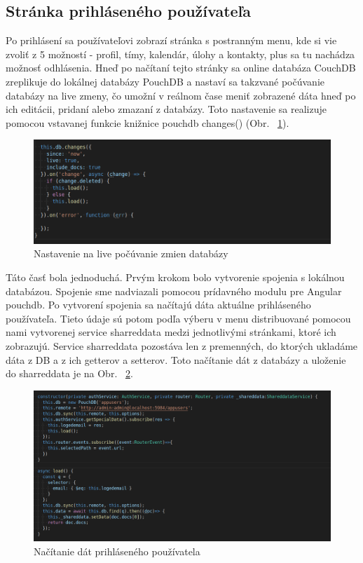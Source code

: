 \subsection{Stránka prihláseného používateľa}
\indent Po prihlásení sa používateľovi zobrazí stránka s postranným menu, kde si vie zvoliť z 5 možností - profil, tímy, kalendár, úlohy a kontakty, plus sa tu nachádza možnosť odhlásenia. Hneď po načítaní tejto stránky sa online databáza CouchDB zreplikuje do lokálnej databázy PouchDB a nastaví sa takzvané počúvanie databázy na live zmeny, čo umožní v reálnom čase meniť zobrazené dáta hneď po ich editácii, pridaní alebo zmazaní z databázy. Toto nastavenie sa realizuje pomocou vstavanej funkcie knižnice pouchdb changes() (Obr. ~\ref{fig:db_change}). 

\begin{figure}[H]
    \centering
    \includegraphics[scale=0.45]{img/imp/db_change.png}
    \caption{Nastavenie na live počúvanie zmien databázy}
    \label{fig:db_change}
\end{figure}

\indent Táto časť bola jednoduchá. Prvým krokom bolo vytvorenie spojenia s lokálnou databázou. Spojenie sme nadviazali pomocou prídavného modulu pre Angular pouchdb. Po vytvorení spojenia sa načítajú dáta aktuálne prihláseného používateľa. Tieto údaje sú potom podľa výberu v menu distribuované pomocou nami vytvorenej service sharreddata medzi jednotlivými stránkami, ktoré ich zobrazujú. Service sharreddata pozostáva len z premenných, do ktorých ukladáme dáta z DB a z ich getterov a setterov. Toto načítanie dát z databázy a uloženie do sharreddata je na Obr. ~\ref{fig:loged_back}.  

\begin{figure}[H]
    \centering
    \includegraphics[scale=0.38]{img/imp/loged_user_back.png}
    \caption{Načítanie dát prihláseného používatela}
    \label{fig:loged_back}
\end{figure}

